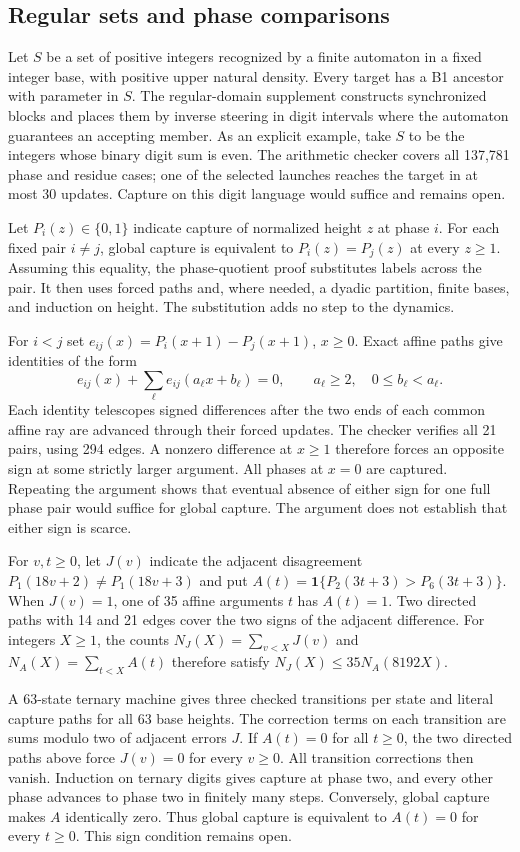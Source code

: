\subsection{Regular sets and phase comparisons}
\label{sec:phase-balance}

Let $S$ be a set of positive integers recognized by a finite automaton in
a fixed integer base, with positive upper natural density. Every target
has a B1 ancestor with parameter in $S$. The regular-domain supplement
constructs synchronized blocks and places them by inverse steering in
digit intervals where the automaton guarantees an accepting member.
As an explicit example, take $S$ to be the integers whose binary digit
sum is even. The arithmetic checker covers all 137,781 phase and residue
cases; one of the selected launches reaches the target in at most 30
updates. Capture on this digit language would suffice and remains open.

Let $P_i(z)\in\{0,1\}$ indicate capture of normalized height $z$ at
phase $i$. For each fixed pair $i\ne j$, global capture is equivalent
to $P_i(z)=P_j(z)$ at every $z\ge1$. Assuming this equality, the
phase-quotient proof substitutes labels across the pair. It then uses
forced paths and, where needed, a dyadic partition, finite bases, and
induction on height. The substitution adds no step to the dynamics.

For $i<j$ set $e_{ij}(x)=P_i(x+1)-P_j(x+1)$, $x\ge0$. Exact affine
paths give identities of the form
\[
 e_{ij}(x)+\sum_{\ell}e_{ij}(a_\ell x+b_\ell)=0,
 \qquad a_\ell\ge2,\quad 0\le b_\ell<a_\ell.
\]
Each identity telescopes signed differences after the two ends of
each common affine ray are advanced through their forced updates.
The checker verifies all 21 pairs, using 294 edges. A nonzero
difference at $x\ge1$ therefore forces an opposite sign at some
strictly larger argument. All phases at $x=0$ are captured. Repeating
the argument shows that eventual absence of either sign for one full
phase pair would suffice for global capture. The argument does not
establish that either sign is scarce.

For $v,t\ge0$, let $J(v)$ indicate the adjacent disagreement
$P_1(18v+2)\ne P_1(18v+3)$ and put
$A(t)=\mathbf{1}\{P_2(3t+3)>P_6(3t+3)\}$. When $J(v)=1$, one of 35
affine arguments $t$ has $A(t)=1$. Two directed paths with 14 and 21
edges cover the two signs of the adjacent difference. For integers
$X\ge1$, the counts $N_J(X)=\sum_{v<X}J(v)$ and
$N_A(X)=\sum_{t<X}A(t)$ therefore satisfy $N_J(X)\le35N_A(8192X)$.

A 63-state ternary machine gives three checked transitions per state and
literal capture paths for all 63 base heights. The correction terms on
each transition are sums modulo two of adjacent errors $J$. If $A(t)=0$
for all $t\ge0$, the two directed paths above force $J(v)=0$ for every
$v\ge0$. All transition corrections then vanish. Induction on ternary
digits gives capture at phase two, and every other phase advances to
phase two in finitely many steps. Conversely, global capture makes
$A$ identically zero. Thus global capture is equivalent to
$A(t)=0$ for every $t\ge0$. This sign condition remains open.
